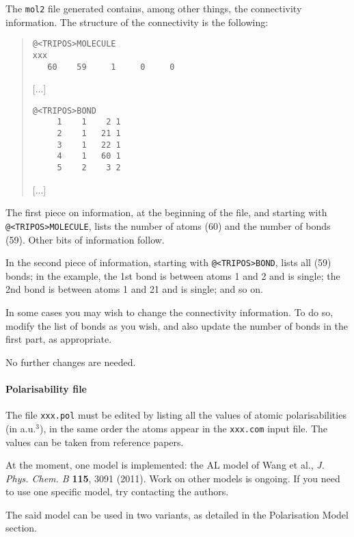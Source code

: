 \documentclass[a4paper]{report}
\begin{document}
The \texttt{mol2} file generated contains, among other things, the connectivity
information. The structure of the connectivity is the following:

\begin{framed}
\begin{quote}
\begin{verbatim}
@<TRIPOS>MOLECULE
xxx
   60    59     1     0     0
\end{verbatim}

[...]

\begin{verbatim}
@<TRIPOS>BOND
     1    1    2 1
     2    1   21 1
     3    1   22 1
     4    1   60 1
     5    2    3 2
\end{verbatim}
[...]

\end{quote}
\end{framed}

The first piece on information, at the beginning of the file, and starting with
\texttt{@<TRIPOS>MOLECULE}, lists the number of atoms (60) and the number of bonds
(59). Other bits of information follow.

In the second piece of information, starting with \texttt{@<TRIPOS>BOND}, lists all
(59) bonds; in the example, the 1st bond is between atoms 1 and 2 and is single; the 2nd
bond is between atoms 1 and 21 and is single; and so on.

In some cases you may wish to change the connectivity information. To do so, modify
the list of bonds as you wish, and also update the number of bonds in the first part,
as appropriate.

No further changes are needed. 

\paragraph*{Polarisability file}

The file \texttt{xxx.pol} must be edited by listing all the values of atomic
polarisabilities (in a.u.$^3$), in the same order the atoms appear in the
\texttt{xxx.com} input file. The values can be taken from reference papers. 

At the moment, one model is implemented: the AL model of Wang et al., \emph{J.
Phys. Chem. B} \textbf{115}, 3091 (2011). Work on other models is ongoing. If you need to use one specific model, try contacting the authors.

The said model can be used in two variants, as detailed in the Polarisation Model section.
\end{document}
